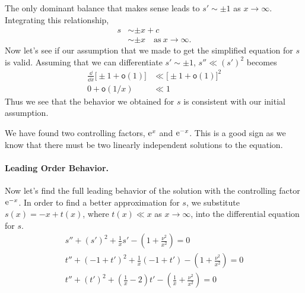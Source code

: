 \begin{Example}
  The only dominant balance that makes sense leads to $s' \sim \pm 1$ as
  $x \to \infty$.  Integrating this relationship,
  \begin{align*}
    s &\sim \pm x + c \\
    &\sim \pm x \quad \mathrm{as}\ x \to \infty.
  \end{align*}
  Now let's see if our assumption that we made to get the simplified equation
  for $s$ is valid.  Assuming that we can differentiate $s' \sim \pm 1$,
  $s'' \ll (s')^2$ becomes
  \begin{align*}
    \frac{\dd}{\dd x} \big[\pm 1 + \mathsf{o}(1)\big] &\ll \big[\pm 1 
    + \mathsf{o}(1)\big]^2 \\
    0 + \mathsf{o}(1/x) &\ll 1
  \end{align*}
  Thus we see that the behavior we obtained for $s$ is consistent with 
  our initial assumption.

  We have found two controlling factors, $\mathop{\mathrm{e}}\nolimits^x$ and $\mathop{\mathrm{e}}\nolimits^{-x}$.  This is a good
  sign as we know that there must be two linearly independent solutions
  to the equation.




  \paragraph{Leading Order Behavior.}
  Now let's find the full leading behavior of the solution with the
  controlling factor $\mathop{\mathrm{e}}\nolimits^{-x}$.  In order to find a better
  approximation for $s$, we substitute $s(x) = -x + t(x)$,
  where $t(x) \ll x$ as $x \to \infty$, into the differential
  equation for $s$. 
  \begin{gather*}
    s'' + (s')^2 + \frac{1}{x} s' - \left(1 + \frac{\nu^2}{x^2}\right) = 0 \\
    t'' + (-1 + t')^2 + \frac{1}{x}(-1 + t') - \left(1 + \frac{\nu^2}{x^2}\right) 
    = 0 \\
    t'' + (t')^2 + \left(\frac{1}{x} - 2\right)t'
    - \left(\frac{1}{x} + \frac{\nu^2}{x^2}\right) = 0 
  \end{gather*}


\end{Example}

